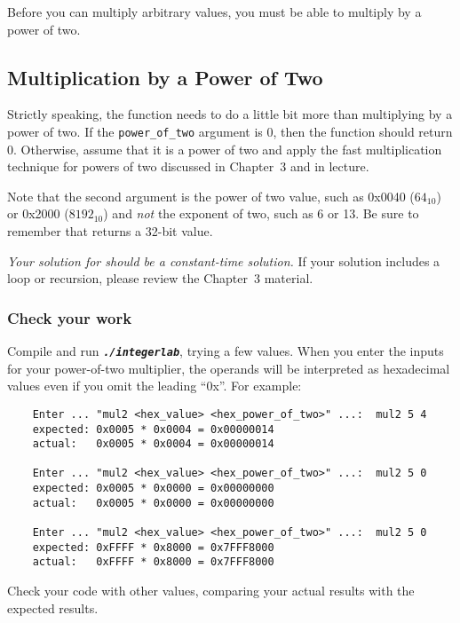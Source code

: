 Before you can multiply arbitrary values, you must be able to multiply by a power of two.

\subsection{Multiplication by a Power of Two}

Strictly speaking, the  function needs to do a little bit more than multiplying by a power of two.
If the \lstinline{power_of_two} argument is 0, then the function should return 0.
Otherwise, assume that it is a power of two and apply the fast multiplication technique for powers of two discussed in Chapter~3 and in lecture.

Note that the second argument is the power of two value, such as 0x0040 ($64_{10}$) or 0x2000 ($8192_{10}$) and \textit{not} the exponent of two, such as 6 or 13.
Be sure to remember that  returns a 32-bit value.

\textit{Your solution for  should be a constant-time solution.}
If your solution includes a loop or recursion, please review the Chapter~3 material.

\subsubsection*{Check your work}

Compile and run \texttt{\textbf{\textit{./integerlab}}}, trying a few values.
When you enter the inputs for your power-of-two multiplier, the operands will be interpreted as hexadecimal values even if you omit the leading ``0x''.
For example:
\begin{verbatim}
    Enter ... "mul2 <hex_value> <hex_power_of_two>" ...:  mul2 5 4
    expected: 0x0005 * 0x0004 = 0x00000014
    actual:   0x0005 * 0x0004 = 0x00000014

    Enter ... "mul2 <hex_value> <hex_power_of_two>" ...:  mul2 5 0
    expected: 0x0005 * 0x0000 = 0x00000000
    actual:   0x0005 * 0x0000 = 0x00000000

    Enter ... "mul2 <hex_value> <hex_power_of_two>" ...:  mul2 5 0
    expected: 0xFFFF * 0x8000 = 0x7FFF8000
    actual:   0xFFFF * 0x8000 = 0x7FFF8000
\end{verbatim}

Check your code with other values, comparing your actual results with the expected results.


